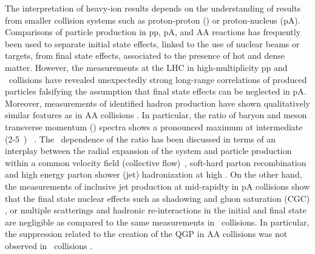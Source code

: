 The interpretation of heavy-ion results depends on the understanding of results from smaller collision systems such as proton-proton (\pp) or proton-nucleus (pA). 
Comparisons of particle production in pp, pA, and AA reactions has frequently been used to separate initial state effects, linked to the use of nuclear beams or targets, from final state effects, associated to the presence of hot and
dense matter. 
However, the measurements at the LHC in high-multiplicity pp and \pPb\ collisions have revealed unexpectedly strong long-range correlations of produced particles \cite{Khachatryan:2010gv,CMS:2012qk,Abelev:2012ola,Aad:2012gla,Aad:2013fja,Chatrchyan:2013nka} falsifying the assumption that final state effects can be neglected in pA.
Moreover, measurements of identified hadron production \cite{Abelev:2013haa} have shown qualitatively similar features as in AA collisions \cite{Abelev:2013xaa,ABELEV:2013wsa}. 
In particular, the ratio of baryon and meson transverse momentum (\pt) spectra shows a pronounced maximum at intermediate (2-5~\gevc) \pt~\cite{Abelev:2013haa}. 
The \pt\ dependence of the ratio has been discussed in terms of an interplay between the radial expansion of the system and particle production within a common velocity field (collective flow)~\cite{Schnedermann:1993ws}, soft-hard parton recombination \cite{Fries:2003vb} and high energy parton shower (jet) hadronization at high \pT. 
On the other hand, the measurements of inclusive jet production at mid-rapidty in pA collisions \cite{Adam:2015hoa,Adam:2015xea} show that the final state nuclear effects such as shadowing and gluon saturation (CGC) \cite{McLerran:2001sr,Salgado:2011wc}, or multiple scatterings and hadronic re-interactions in the initial and final state \cite{Krzywicki:1979gv,Accardi:2007in} are negligible as compared to the same measurements in \pp\ collisions. 
In particular, the suppression related to the creation of the QGP in AA collisions was not observed in \pPb\ collisions \cite{Aad:2010bu,Chatrchyan:2012nia,Aad:2012vca,Abelev:2013kqa,Aad:2014bxa}.


